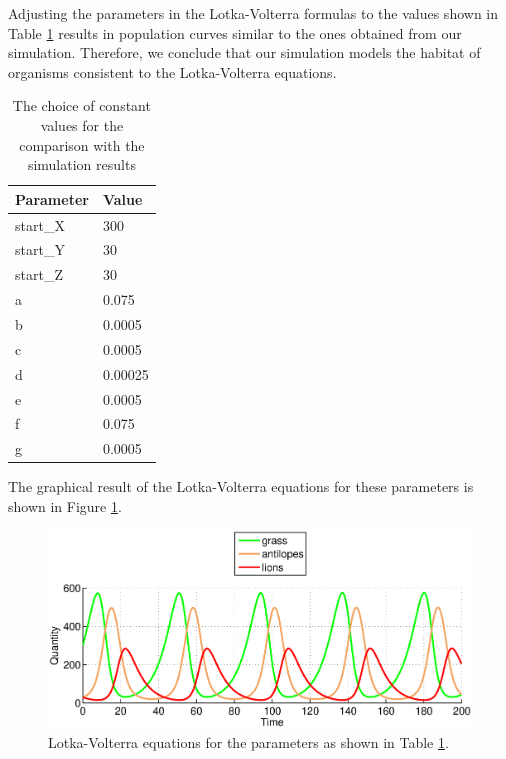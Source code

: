 \documentclass[11pt]{article}
\begin{document}
Adjusting the parameters in the Lotka-Volterra formulas to the values shown in Table \ref{tab:LotkaVolterraParametersFinal} results in  population curves similar to the ones obtained from our simulation. Therefore, we conclude that our simulation models the habitat of organisms consistent to the Lotka-Volterra equations. 

\begin{table}[htbp]
\centering
\begin{tabular}{l|l}
Parameter & Value \\ 
\hline 
\hline
start\_X & 300\\
\hline
start\_Y & 30\\
\hline
start\_Z & 30\\
\hline
a & 0.075\\ 
\hline 
b & 0.0005\\ 
\hline 
c & 0.0005\\  
\hline 
d & 0.00025\\
\hline 
e & 0.0005\\
\hline 
f & 0.075\\
\hline 
g & 0.0005\\
\end{tabular}
\caption{The choice of constant values for the comparison with the simulation results}
\label{tab:LotkaVolterraParametersFinal}
\end{table}

The graphical result of the Lotka-Volterra equations for these parameters is shown in Figure \ref{fig:LotkaVolterraThreeAdjusted}.

\begin{figure}
\centering
\includegraphics[scale=0.65]{LotkaVolterraThreeAdjusted.eps}
\caption{Lotka-Volterra equations for the parameters as shown in Table \ref{tab:LotkaVolterraParametersFinal}.}
\label{fig:LotkaVolterraThreeAdjusted}
\end{figure}
\end{document}
